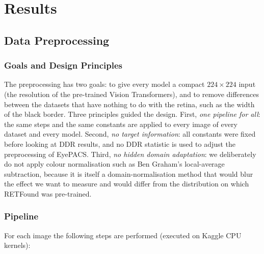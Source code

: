 \chapter{Results}
\label{chap:results}

\section{Data Preprocessing}
\label{sec:data_preprocessing}

\subsection{Goals and Design Principles}
\label{subsec:prep_goals}

The preprocessing has two goals: to give every model a compact $224\times224$ input (the resolution of the pre-trained Vision Transformers), and to remove differences between the datasets that have nothing to do with the retina, such as the width of the black border. Three principles guided the design. First, \emph{one pipeline for all}: the same steps and the same constants are applied to every image of every dataset and every model. Second, \emph{no target information}: all constants were fixed before looking at DDR results, and no DDR statistic is used to adjust the preprocessing of EyePACS. Third, \emph{no hidden domain adaptation}: we deliberately do not apply colour normalisation such as Ben Graham's local-average subtraction, because it is itself a domain-normalisation method that would blur the effect we want to measure and would differ from the distribution on which RETFound was pre-trained.

\subsection{Pipeline}
\label{subsec:prep_pipeline}

For each image the following steps are performed (executed on Kaggle CPU kernels):

